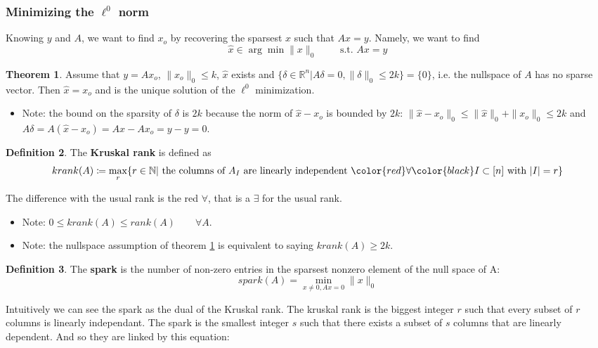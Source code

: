 \documentclass[12pt, openany]{report}
\newcommand{\R}{\mathbb{R}}
\newcommand{\N}{\mathbb{N}}
\theoremstyle{definition}
\newtheorem{thm}{Theorem}[chapter]
\newtheorem{definition}[thm]{Definition}
\begin{document}
\subsubsection{Minimizing the $\ell^0$ norm}
Knowing $y$ and $A$, we want to find $x_o$ by recovering the sparsest $x$ such that $Ax=y$. Namely, we want to find
\begin{equation}
	\hat x\in \arg\min \|x\|_0 \qquad \text{ s.t. } Ax=y
\end{equation}
\begin{thm}\label{thm:fuck}
	Assume that $y=Ax_o$, $\|x_o\|_0 \le k$, $\hat x$ exists and $\{\delta \in \R^n | A\delta = 0, \|\delta \|_0 \le 2k\}=\{0\}$, i.e. the nullspace of $A$ has no sparse vector. Then $\hat x=x_o$ and is the unique solution of the $\ell^0$ minimization. 
	\begin{itemize}
		\item [$\to$] Note: the bound on the sparsity of $\delta$ is $2k$ because the norm of $\hat x-x_o$ is bounded by $2k$: $\|\hat x-x_o\|_0 \le \|\hat x\|_0 + \|x_o\|_0 \le 2k$ and $A\delta = A(\hat x-x_o) = A\hat x-Ax_o = y-y=0$.
	\end{itemize}
\end{thm}
\begin{definition}
	The \textbf{Kruskal rank} is defined as 
	\begin{equation}
		krank(A) \coloneqq \max_r \{r\in \N | \text{ the columns of }A_I \text{ are linearly independent }\color{red}\forall\color{black} I\subset [n]\text{ with } |I| = r\}
	\end{equation}
\end{definition}
The difference with the usual rank is the red $\forall$, that is a $\exists$ for the usual rank. 
\begin{itemize}
	\item [$\to$] Note: $0\le krank(A)\le rank(A)\qquad \forall A$.
	\item [$\to$] Note: the nullspace assumption of theorem \ref{thm:fuck} is equivalent to saying $krank(A)\ge 2k$. 
\end{itemize}
\begin{definition}
	The \textbf{spark} is the number of non-zero entries in the sparsest nonzero element of the null space of A:
	\begin{equation}
		spark(A) = \min_{x \neq 0, Ax=0} \|x\|_0
	\end{equation}
\end{definition}
Intuitively we can see the spark as the dual of the Kruskal rank. The kruskal rank is the biggest integer $r$ such that every subset of $r$ columns is linearly independant. The spark is the smallest integer $s$ such that there exists a subset of $s$ columns that are linearly dependent. And so they are linked by this equation:
\end{document}
